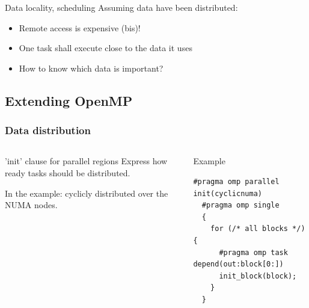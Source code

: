 \documentclass[xcolor={usenames,dvipsnames,svgnames,table}, aspectratio=43]{beamer}
\begin{document}
\begin{frame}[fragile]
{{}
}
 {
\begin{block}{Data locality, scheduling}
  Assuming data have been distributed:
    \begin{itemize}
      \item Remote access is expensive (bis)!
      \item One task shall execute close to the data it uses
      \item How to know which data is important?
    \end{itemize}
\end{block}

}

\end{frame}


\subsection{Extending OpenMP}

\begin{frame}[fragile]
\frametitle{Data distribution}
\begin{columns}[T,onlytextwidth]
\begin{block}{'init' clause for parallel regions}
Express how ready tasks should be distributed.

      \textcolor{YellowOrange}{
        In the example: cyclicly distributed over the NUMA nodes.
    }
\end{block}



\begin{block}{Example}
  \begin{lstlisting}[numbers=none]
  #pragma omp parallel init(cyclicnuma)
  #pragma omp single
  {
    for (/* all blocks */) {
      #pragma omp task depend(out:block[0:])
      init_block(block);
    }
  }
  \end{lstlisting}
\end{block}
\end{columns}

\end{frame}
\end{document}
